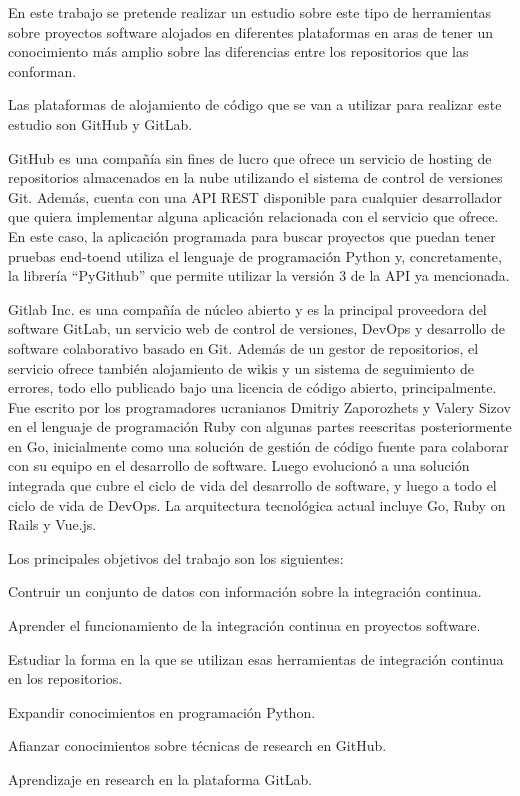 En este trabajo se pretende realizar un estudio sobre este tipo de herramientas sobre proyectos software alojados en diferentes plataformas en aras de tener un conocimiento más amplio sobre las diferencias entre los repositorios que las conforman.

Las plataformas de alojamiento de código que se van a utilizar para realizar este estudio son GitHub y GitLab.

GitHub es una compañía sin fines de lucro que ofrece un servicio de hosting de repositorios almacenados en la nube utilizando el sistema de control de versiones Git. 
Además, cuenta con una API REST disponible para cualquier desarrollador que quiera implementar alguna aplicación relacionada con el servicio que ofrece. 
En este caso, la aplicación programada para buscar proyectos que puedan tener pruebas end-toend utiliza el lenguaje de programación Python y, concretamente, la librería “PyGithub” que permite utilizar la versión 3 de la API ya mencionada.

Gitlab Inc. es una compañía de núcleo abierto y es la principal proveedora del software GitLab, un servicio web de control de versiones, DevOps y desarrollo de software colaborativo basado en Git. Además de un gestor de repositorios, el servicio ofrece también alojamiento de wikis y un sistema de seguimiento de errores, todo ello publicado bajo una licencia de código abierto, principalmente.
Fue escrito por los programadores ucranianos Dmitriy Zaporozhets y Valery Sizov en el lenguaje de programación Ruby con algunas partes reescritas posteriormente en Go, inicialmente como una solución de gestión de código fuente para colaborar con su equipo en el desarrollo de software. Luego evolucionó a una solución integrada que cubre el ciclo de vida del desarrollo de software, y luego a todo el ciclo de vida de DevOps. La arquitectura tecnológica actual incluye Go, Ruby on Rails y Vue.js.

Los principales objetivos del trabajo son los siguientes:
\begin{compactitem}
    \item Contruir un conjunto de datos con información sobre la integración continua.
    \item Aprender el funcionamiento de la integración continua en proyectos software.
    \item Estudiar la forma en la que se utilizan esas herramientas de integración continua en los repositorios.
    \item Expandir conocimientos en programación Python.
    \item Afianzar conocimientos sobre técnicas de research en GitHub.
    \item Aprendizaje en research en la plataforma GitLab.
\end{compactitem}

